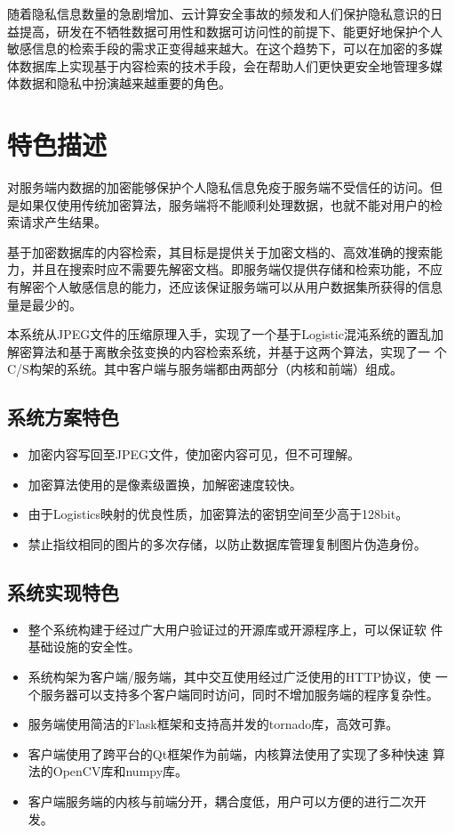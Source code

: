 随着隐私信息数量的急剧增加、云计算安全事故的频发和人们保护隐私意识的日
益提高，研发在不牺牲数据可用性和数据可访问性的前提下、能更好地保护个人
敏感信息的检索手段的需求正变得越来越大。在这个趋势下，可以在加密的多媒
体数据库上实现基于内容检索的技术手段，会在帮助人们更快更安全地管理多媒
体数据和隐私中扮演越来越重要的角色。

\section{特色描述}
\label{sec:spec-description}

对服务端内数据的加密能够保护个人隐私信息免疫于服务端不受信任的访问。但
是如果仅使用传统加密算法，服务端将不能顺利处理数据，也就不能对用户的检
索请求产生结果。

基于加密数据库的内容检索，其目标是提供关于加密文档的、高效准确的搜索能
力，并且在搜索时应不需要先解密文档。即服务端仅提供存储和检索功能，不应
有解密个人敏感信息的能力，还应该保证服务端可以从用户数据集所获得的信息
量是最少的。

本系统从JPEG文件的压缩原理入手，实现了一个基于Logistic混沌系统的置乱加
解密算法和基于离散余弦变换的内容检索系统，并基于这两个算法，实现了一
个C/S构架的系统。其中客户端与服务端都由两部分（内核和前端）组成。

\subsection{系统方案特色}
\label{sec:sys-design-spec}
\begin{itemize}
\item 加密内容写回至JPEG文件，使加密内容可见，但不可理解。
\item 加密算法使用的是像素级置换，加解密速度较快。
\item 由于Logistics映射的优良性质\cite{li2011}，加密算法的密钥空间至少高于128bit。
\item 禁止指纹相同的图片的多次存储，以防止数据库管理复制图片伪造身份。
\end{itemize}

\subsection{系统实现特色}
\label{sec:sys-impl-spec}
\begin{itemize}
\item 整个系统构建于经过广大用户验证过的开源库或开源程序上，可以保证软
件基础设施的安全性。
\item 系统构架为客户端/服务端，其中交互使用经过广泛使用的HTTP协议，使
一个服务器可以支持多个客户端同时访问，同时不增加服务端的程序复杂性。
\item 服务端使用简洁的Flask框架和支持高并发的tornado库，高效可靠。
\item 客户端使用了跨平台的Qt框架作为前端，内核算法使用了实现了多种快速
算法的OpenCV库和numpy库。
\item 客户端服务端的内核与前端分开，耦合度低，用户可以方便的进行二次开
发。
\end{itemize}

